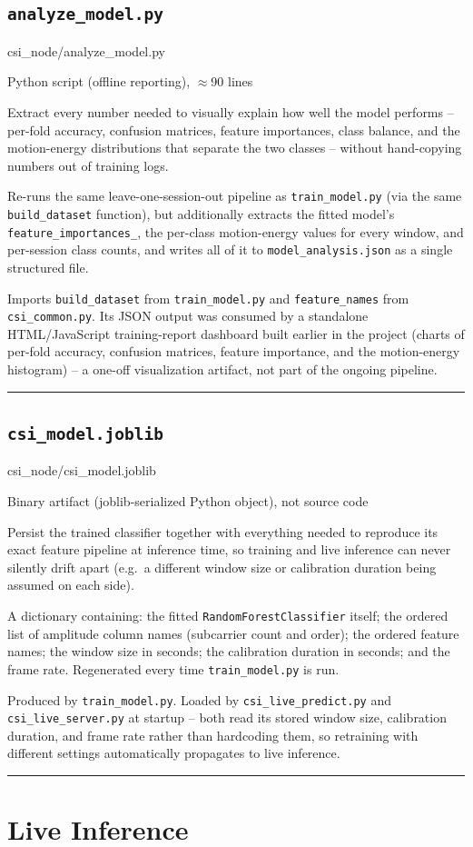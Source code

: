 \documentclass[11pt,a4paper]{article}
\newcommand{\filepath}[1]{{\small\ttfamily\color{pathgray}#1}}
\newcommand{\fileentry}[6]{%
    \subsection{\texttt{#1}}
    \filepath{#2}
    \vspace{0.15cm}
    \begin{description}[leftmargin=2.6cm, style=nextline]
        \item[Type] #3
        \item[Objective] #4
        \item[Role] #5
        \item[Connections] #6
    \end{description}
    \vspace{0.2cm}
    \hrule
    \vspace{0.3cm}
}
\begin{document}
\fileentry
{analyze\_model.py}
{csi\_node/analyze\_model.py}
{Python script (offline reporting), \(\approx\)90 lines}
{Extract every number needed to visually explain how well the model
    performs -- per-fold accuracy, confusion matrices, feature
    importances, class balance, and the motion-energy distributions that
    separate the two classes -- without hand-copying numbers out of
    training logs.}
{Re-runs the same leave-one-session-out pipeline as
    \texttt{train\_model.py} (via the same \texttt{build\_dataset}
    function), but additionally extracts the fitted model's
    \texttt{feature\_importances\_}, the per-class motion-energy values
    for every window, and per-session class counts, and writes all of it
    to \texttt{model\_analysis.json} as a single structured file.}
{Imports \texttt{build\_dataset} from \texttt{train\_model.py} and
    \texttt{feature\_names} from \texttt{csi\_common.py}. Its JSON
    output was consumed by a standalone HTML/JavaScript training-report
    dashboard built earlier in the project (charts of per-fold accuracy,
    confusion matrices, feature importance, and the motion-energy
    histogram) -- a one-off visualization artifact, not part of the
    ongoing pipeline.}

\fileentry
{csi\_model.joblib}
{csi\_node/csi\_model.joblib}
{Binary artifact (joblib-serialized Python object), not source code}
{Persist the trained classifier together with everything needed to
    reproduce its exact feature pipeline at inference time, so training
    and live inference can never silently drift apart (e.g.\ a different
    window size or calibration duration being assumed on each side).}
{A dictionary containing: the fitted \texttt{RandomForestClassifier}
    itself; the ordered list of amplitude column names (subcarrier
    count and order); the ordered feature names; the window size in
    seconds; the calibration duration in seconds; and the frame rate.
    Regenerated every time \texttt{train\_model.py} is run.}
{Produced by \texttt{train\_model.py}. Loaded by
    \texttt{csi\_live\_predict.py} and \texttt{csi\_live\_server.py} at
    startup -- both read its stored window size, calibration duration,
    and frame rate rather than hardcoding them, so retraining with
    different settings automatically propagates to live inference.}

\section{Live Inference}
\end{document}
